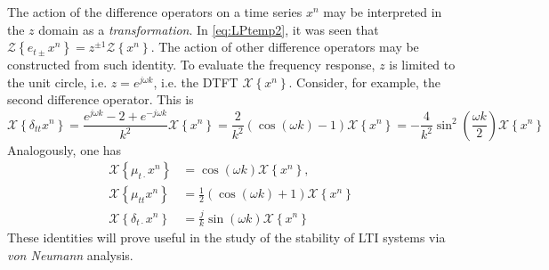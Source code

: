 \documentclass[11pt,twoside,a4paper,english]{book}
\newcommand{\dtd}{\delta_{t\cdot}}
\newcommand{\dtt}{\delta_{tt}}
\newcommand{\mtd}{\mu_{t\cdot}}
\newcommand{\mtt}{\mu_{tt}}
\begin{document}
The action of the difference operators on a time series $x^n$ may be interpreted in the $z$ domain as a \emph{transformation}. In \eqref{eq:LPtemp2}, it was seen that $\mathcal{Z}\left\{e_{t\pm} x^n\right\} = z^{\pm 1} \mathcal{Z}\left\{x^n\right\}$. 
The action of other difference operators may be constructed from such identity. To evaluate the frequency response, $z$ is limited to the unit circle, i.e. $z=e^{j\omega k}$, i.e. the DTFT $\mathcal X\left\{x^n \right\}$. Consider, for example, the second difference operator. This is
\begin{equation}\label{eq:DTFTdtt}
\mathcal{X}\left\{\dtt x^n\right\} = \frac{e^{j\omega k}-2+e^{-j\omega k}}{k^2}\mathcal{X}\left\{x^n\right\}=\frac{2}{k^2}\left(\cos(\omega k)-1 \right)\mathcal{X}\left\{x^n\right\} = -\frac{4}{k^2} \sin^2\left(\frac{\omega k}{2}\right)\mathcal{X}\left\{x^n\right\}
\end{equation}
Analogously, one has
\begin{subequations}
\begin{align}
\mathcal{X}\left\{\mtd x^n\right\} &= \cos(\omega k) \mathcal{X}\left\{x^n \right\}, \\
\mathcal{X}\left\{\mtt x^n\right\} &= \frac{1}{2}\left(\cos(\omega k) + 1\right)\mathcal{X}\left\{x^n \right\} \\
\mathcal{X}\left\{\dtd x^n\right\} &= \frac{j}{k}\sin(\omega k) \mathcal{X}\left\{x^n \right\}
\end{align}
\end{subequations}
These identities will prove useful in the study of the stability of LTI systems via \emph{von Neumann} analysis. 
\end{document}
